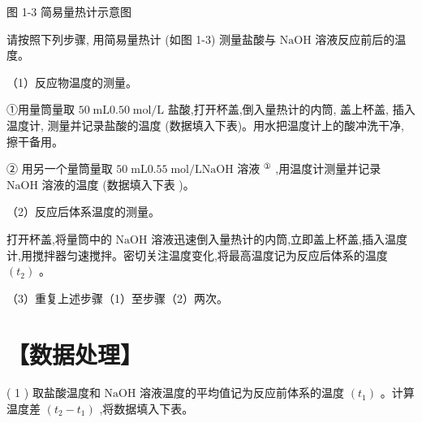 \documentclass[10pt]{article}
\begin{document}
图 1-3 简易量热计示意图

请按照下列步骤, 用简易量热计 (如图 1-3) 测量盐酸与 \(\mathrm{{NaOH}}\) 溶液反应前后的温度。

（1）反应物温度的测量。

①用量筒量取 \({50}\mathrm{\;{mL}}{0.50}\mathrm{\;{mol}}/\mathrm{L}\) 盐酸,打开杯盖,倒入量热计的内筒, 盖上杯盖, 插入温度计, 测量并记录盐酸的温度 (数据填入下表)。用水把温度计上的酸冲洗干净, 擦干备用。

② 用另一个量筒量取 \({50}\mathrm{\;{mL}}{0.55}\mathrm{\;{mol}}/\mathrm{L}\mathrm{{NaOH}}\) 溶液 \({}^{\text{①}}\) ,用温度计测量并记录 \(\mathrm{{NaOH}}\) 溶液的温度 (数据填入下表 )。

（2）反应后体系温度的测量。

打开杯盖,将量筒中的 \(\mathrm{{NaOH}}\) 溶液迅速倒入量热计的内筒,立即盖上杯盖,插入温度计,用搅拌器匀速搅拌。密切关注温度变化,将最高温度记为反应后体系的温度 \(\left( {t}_{2}\right)\) 。

（3）重复上述步骤（1）至步骤（2）两次。

\section*{【数据处理】}

( 1 ) 取盐酸温度和 \(\mathrm{{NaOH}}\) 溶液温度的平均值记为反应前体系的温度 \(\left( {t}_{1}\right)\) 。计算温度差 \(\left( {{t}_{2} - {t}_{1}}\right)\) ,将数据填入下表。

\begin{center}
\end{center}
\end{document}
